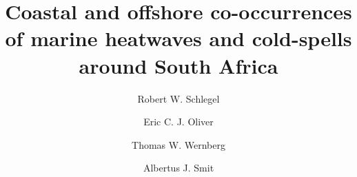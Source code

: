 \documentclass[a4paper,10pt,review]{elsarticle}
\begin{document}
\begin{frontmatter}

\title{Coastal and offshore co-occurrences of marine heatwaves and cold-spells around South Africa}

\author[firstaddress]{Robert W. Schlegel}
\author[secondaddress,thirdaddress]{Eric C. J. Oliver}
\author[fourthaddress]{Thomas W. Wernberg}
\author[firstaddress]{Albertus J. Smit}


\address[firstaddress]{Department of Biodiversity and Conservation Biology, University of the Western Cape, Private Bag X17, Bellville 7535, South Africa}

\address[secondaddress]{ARC Centre of Excellence for Climate System Science, Australia}

\address[thirdaddress]{Institute for Marine and Antarctic Studies, University of Tasmania, Hobart, Australia}

\address[fourthaddress]{UWA Oceans Institute and School of Plant Biology, The University of Western Australia, Crawley, 6009 Western Australia, Australia}


\end{frontmatter}
\end{document}
